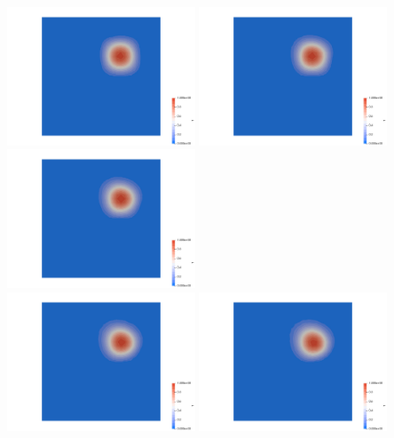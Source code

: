 \begin{center}
\includegraphics[width=5.6cm]{python_codes/fieldstone_45/results/reg0000}
\includegraphics[width=5.6cm]{python_codes/fieldstone_45/results/reg0001}
\includegraphics[width=5.6cm]{python_codes/fieldstone_45/results/reg0002}\\
\includegraphics[width=5.6cm]{python_codes/fieldstone_45/results/reg0003}
\includegraphics[width=5.6cm]{python_codes/fieldstone_45/results/reg0004}

\end{center}
